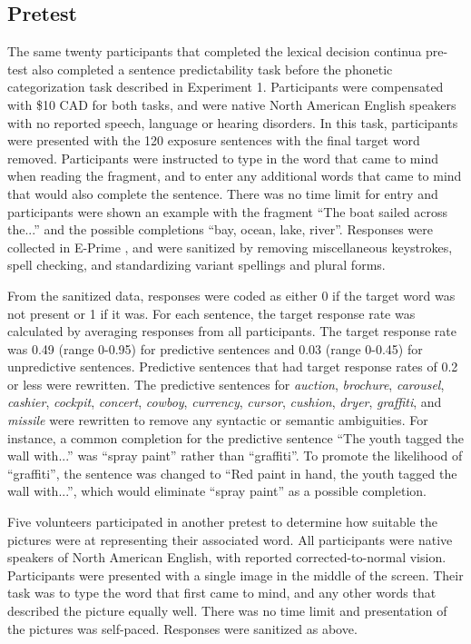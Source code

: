 \subsection{Pretest}

The same twenty participants that completed the lexical decision continua pre-test also completed a sentence predictability task before the phonetic categorization task described in Experiment 1. 
Participants were compensated with \$10 CAD for both tasks, and were native North American English speakers with no reported speech, language or hearing disorders. 
In this task, participants were presented with the 120 exposure sentences with the final target word removed.
Participants were instructed to type in the word that came to mind when reading the fragment, and to enter any additional words that came to mind that would also complete the sentence.
There was no time limit for entry and participants were shown an example with the fragment ``The boat sailed across the...'' and the possible completions ``bay, ocean, lake, river''.  
Responses were collected in E-Prime \citep{PsychologySoftwareTools2012}, and were sanitized by removing miscellaneous keystrokes, spell checking, and standardizing variant spellings and plural forms.

From the sanitized data, responses were coded as either 0 if the target word was not present or 1 if it was.
For each sentence, the target response rate was calculated by averaging responses from all participants.
The target response rate was 0.49 (range 0-0.95) for predictive sentences and 0.03 (range 0-0.45) for unpredictive sentences.
Predictive sentences that had target response rates of 0.2 or less were rewritten.  
The predictive sentences for \emph{auction}, \emph{brochure}, \emph{carousel}, \emph{cashier}, \emph{cockpit}, \emph{concert}, \emph{cowboy}, \emph{currency}, \emph{cursor}, \emph{cushion}, \emph{dryer}, \emph{graffiti}, and \emph{missile} were rewritten to remove any syntactic or semantic ambiguities.
For instance, a common completion for the predictive sentence ``The youth tagged the wall with...'' was ``spray paint'' rather than ``graffiti''.
To promote the likelihood of ``graffiti'', the sentence was changed to ``Red paint in hand, the youth tagged the wall with...'', which would eliminate ``spray paint'' as a possible completion.

Five volunteers participated in another pretest to determine how suitable the pictures were at representing their associated word.  
All participants were native speakers of North American English, with reported corrected-to-normal vision. Participants were presented with a single image in the middle of the screen.  
Their task was to type the word that first came to mind, and any other words that described the picture equally well.  
There was no time limit and presentation of the pictures was self-paced. Responses were sanitized as above.  

